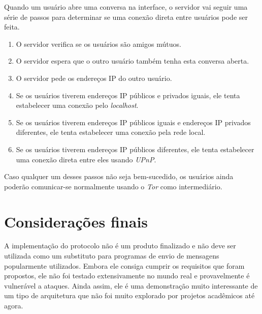 Quando um usuário abre uma conversa na interface, o servidor vai seguir uma série de passos para determinar se uma conexão direta entre usuários pode ser feita.
\begin{enumerate}
    \item O servidor verifica se os usuários são amigos mútuos.
    \item O servidor espera que o outro usuário também tenha esta conversa aberta.
    \item O servidor pede os endereços IP do outro usuário.
    \item Se os usuários tiverem endereços IP públicos e privados iguais, ele tenta estabelecer uma conexão pelo \textit{localhost}.
    \item Se os usuários tiverem endereços IP públicos iguais e endereços IP privados diferentes, ele tenta estabelecer uma conexão pela rede local.
    \item Se os usuários tiverem endereços IP públicos diferentes, ele tenta estabelecer uma conexão direta entre eles usando \textit{UPnP}.
\end{enumerate}

Caso qualquer um desses passos não seja bem-sucedido, os usuários ainda poderão comunicar-se normalmente usando o \textit{Tor} como intermediário.

\section{Considerações finais}

A implementação do protocolo não é um produto finalizado e não deve ser utilizada como um substituto para programas de envio de mensagens popularmente utilizados. Embora ele consiga cumprir os requisitos que foram propostos, ele não foi testado extensivamente no mundo real e provavelmente é vulnerável a ataques. Ainda assim, ele é uma demonstração muito interessante de um tipo de arquitetura que não foi muito explorado por projetos acadêmicos até agora.